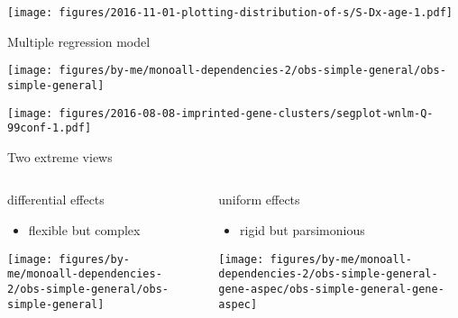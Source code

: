 \documentclass{beamer} %
\begin{document}
\begin{frame}[label=S-Age,plain]
\begin{center}
\texttt{[image: figures/2016-11-01-plotting-distribution-of-s/S-Dx-age-1.pdf]}
\end{center}
\end{frame}

\begin{frame}{Multiple regression model}

\texttt{[image: figures/by-me/monoall-dependencies-2/obs-simple-general/obs-simple-general]}
\end{frame}

\begin{frame}
\texttt{[image: figures/2016-08-08-imprinted-gene-clusters/segplot-wnlm-Q-99conf-1.pdf]}
\end{frame}

\begin{frame}{Two extreme views}
\begin{columns}[t]
\begin{column}{0.5\textwidth}

differential effects
\begin{itemize}
\item flexible but complex
\end{itemize}

\texttt{[image: figures/by-me/monoall-dependencies-2/obs-simple-general/obs-simple-general]}
\end{column}

\begin{column}{0.5\textwidth}

uniform effects
\begin{itemize}
\item rigid but parsimonious
\end{itemize}

\texttt{[image: figures/by-me/monoall-dependencies-2/obs-simple-general-gene-aspec/obs-simple-general-gene-aspec]}
\end{column}
\end{columns}
\end{frame}

\end{document}
